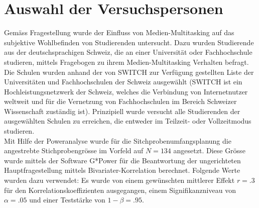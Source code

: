 \section{Auswahl der Versuchspersonen}\label{section.auswahlVersuchsp}
Gemäss Fragestellung wurde der Einfluss von Medien-Multitasking auf das subjektive Wohlbefinden von Studierenden untersucht. Dazu wurden Studierende aus der deutschsprachigen Schweiz, die an einer Universität oder Fachhochschule studieren, mittels Fragebogen zu ihrem Medien-Multitasking Verhalten befragt. Die Schulen wurden anhand der von SWITCH \cite{Switch2014} zur Verfügung gestellten Liste der Universitäten und Fachhochschulen der Schweiz ausgewählt (SWITCH ist ein Hochleistungsnetzwerk der Schweiz, welches die Verbindung von Internetnutzer weltweit und für die Vernetzung von Fachhochschulen im Bereich Schweizer Wissenschaft zuständig ist). Prinzipiell wurde versucht alle Studierenden der ausgewählten Schulen zu erreichen, die entweder im Teilzeit- oder Vollzeitmodus studieren. \\
Mit Hilfe der Poweranalyse \cite{Faul2009} wurde für die Sitchprobenumfangsplanung die angestrebte  Stichprobengrösse im Vorfeld auf $N = 134$ angesetzt. Diese Grösse wurde mittels der Software G*Power \cite{Gpower2014} für die Beantwortung der ungerichteten Hauptfragestellung mittels Bivariater-Korrelation berechnet. Folgende Werte wurden dazu verwendet: Es wurde von einem gewünschten mittlerer Effekt $r = .3$  \cite{Cohen1988} für den Korrelationskoeffizienten ausgegangen, einem Signifikanzniveau von $\alpha=.05$ und einer Teststärke von $1-\beta=.95$.

